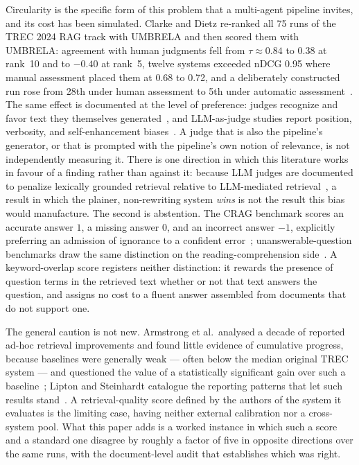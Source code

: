 \documentclass[acmsmall,review,anonymous,screen]{acmart}
\begin{document}
Circularity is the specific form of this problem that a multi-agent pipeline
invites, and its cost has been simulated. Clarke and Dietz re-ranked all 75 runs
of the TREC 2024 RAG track with UMBRELA and then scored them with UMBRELA:
agreement with human judgments fell from $\tau \approx 0.84$ to 0.38 at rank~10
and to $-0.40$ at rank~5, twelve systems exceeded nDCG 0.95 where manual
assessment placed them at 0.68 to 0.72, and a deliberately constructed run rose
from 28th under human assessment to 5th under automatic
assessment~\cite{clarke2024cannot}. The same effect is documented at the level
of preference: judges recognize and favor text they themselves
generated~\cite{panickssery2024self}, and LLM-as-judge studies report position,
verbosity, and self-enhancement biases~\cite{zheng2023judge}. A judge that is
also the pipeline's generator, or that is prompted with the pipeline's own
notion of relevance, is not independently measuring it. There is one direction
in which this literature works in favour of a finding rather than against it:
because LLM judges are documented to penalize lexically grounded retrieval
relative to LLM-mediated retrieval~\cite{faggioli2023perspectives}, a result in
which the plainer, non-rewriting system \emph{wins} is not the result this bias
would manufacture. The second
is abstention. The CRAG benchmark scores an accurate answer $1$, a missing answer
$0$, and an incorrect answer $-1$, explicitly preferring an admission of
ignorance to a confident
error~\cite{yang2024}; unanswerable-question benchmarks draw the same
distinction on the reading-comprehension side~\cite{rajpurkar2018squad2}. A
keyword-overlap score registers neither distinction: it rewards the presence of
question terms in the retrieved text whether or not that text answers the
question, and assigns no cost to a fluent answer assembled from documents that do
not support one.

The general caution is not new. Armstrong et al.\ analysed a decade of reported
ad-hoc retrieval improvements and found little evidence of cumulative progress,
because baselines were generally weak --- often below the median original TREC
system --- and questioned the value of a statistically significant gain over such
a baseline~\cite{armstrong2009improvements}; Lipton and Steinhardt catalogue the
reporting patterns that let such results stand~\cite{lipton2019trends}. A
retrieval-quality score defined by the authors of the system it evaluates is the
limiting case, having neither external calibration nor a cross-system pool. What
this paper adds is a worked instance in which such a score and a standard one
disagree by roughly a factor of five in opposite directions over the same runs,
with the document-level audit that establishes which was right.
\end{document}
